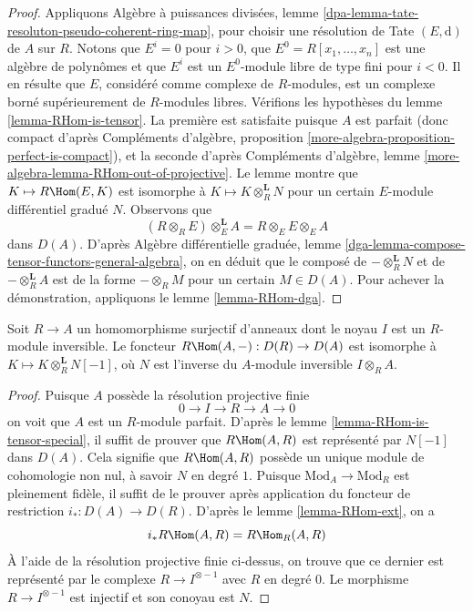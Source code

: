 \begin{proof}
Appliquons Algèbre à puissances divisées, lemme \ref{dpa-lemma-tate-resoluton-pseudo-coherent-ring-map},
pour choisir une résolution de Tate $(E, \text{d})$ de $A$ sur $R$.
Notons que $E^i = 0$ pour $i > 0$, que $E^0 = R[x_1, \ldots, x_n]$ est une algèbre de polynômes
et que $E^i$ est un $E^0$-module libre de type fini pour $i < 0$.
Il en résulte que $E$, considéré comme complexe de $R$-modules,
est un complexe borné supérieurement de $R$-modules libres.
Vérifions les hypothèses du lemme \ref{lemma-RHom-is-tensor}.
La première est satisfaite puisque $A$ est parfait
(donc compact d'après Compléments d'algèbre, proposition \ref{more-algebra-proposition-perfect-is-compact}),
et la seconde d'après Compléments d'algèbre, lemme \ref{more-algebra-lemma-RHom-out-of-projective}.
Le lemme montre que $K \mapsto R\Hom(E, K)$ est isomorphe à $K \mapsto K \otimes_R^\mathbf{L} N$
pour un certain $E$-module différentiel gradué $N$.
Observons que
$$
(R \otimes_R E) \otimes_E^\mathbf{L} A = R \otimes_E E \otimes_E A
$$
dans $D(A)$. D'après Algèbre différentielle graduée, lemme \ref{dga-lemma-compose-tensor-functors-general-algebra},
on en déduit que le composé de $- \otimes_R^\mathbf{L} N$ et de $- \otimes_R^\mathbf{L} A$
est de la forme $- \otimes_R M$ pour un certain $M \in D(A)$.
Pour achever la démonstration, appliquons le lemme \ref{lemma-RHom-dga}.
\end{proof}

\begin{lemma}
\label{lemma-compute-for-effective-Cartier-algebraic}
Soit $R \to A$ un homomorphisme surjectif d'anneaux dont le noyau $I$
est un $R$-module inversible. Le foncteur
$R\Hom(A, -) : D(R) \to D(A)$
est isomorphe à $K \mapsto K \otimes_R^\mathbf{L} N[-1]$,
où $N$ est l'inverse du $A$-module inversible $I \otimes_R A$.
\end{lemma}

\begin{proof}
Puisque $A$ possède la résolution projective finie
$$
0 \to I \to R \to A \to 0
$$
on voit que $A$ est un $R$-module parfait.
D'après le lemme \ref{lemma-RHom-is-tensor-special}, il suffit de prouver que $R\Hom(A, R)$
est représenté par $N[-1]$ dans $D(A)$.
Cela signifie que $R\Hom(A, R)$ possède un unique module de cohomologie non nul,
à savoir $N$ en degré $1$.
Puisque $\text{Mod}_A \to \text{Mod}_R$ est pleinement fidèle, il suffit de le prouver
après application du foncteur de restriction $i_* : D(A) \to D(R)$.
D'après le lemme \ref{lemma-RHom-ext}, on a
$$
i_*R\Hom(A, R) = R\Hom_R(A, R)
$$
À l'aide de la résolution projective finie ci-dessus, on trouve que
ce dernier est représenté par le complexe $R \to I^{\otimes -1}$ avec $R$
en degré $0$. Le morphisme $R \to I^{\otimes -1}$ est injectif
et son conoyau est $N$.
\end{proof}






